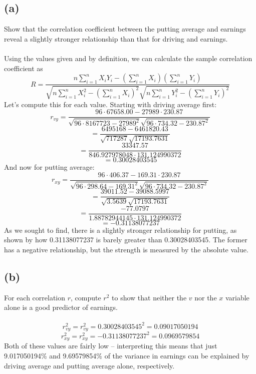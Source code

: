 \documentclass{article}
\begin{document}
{\subsection*{(a)} 
Show that the correlation coefficient between the
putting average and earnings reveal a slightly stronger relationship than that for driving and earnings.
\\
\\
Using the values given and by definition, we can calculate the sample correlation coefficient as 
\[
R = \frac{n \sum_{i=1}^{n} X_i Y_i - (\sum_{i=1}^{n} X_i)(\sum_{i=1}^{n}Y_i)}{\sqrt{n \sum_{i=1}^{n} X_i^2 - (\sum_{i=1}^{n} X_i)^2} \sqrt{n\sum_{i=1}^{n}Y_i^2 - (\sum_{i=1}^{n} Y_i)^2}}
\]
Let's compute this for each value. Starting with driving average first:
\[
r_{vy} = \frac{96 \cdot 67658.00 - 27989 \cdot 230.87}{\sqrt{96 \cdot 8167723 - 27989^2} \sqrt{96 \cdot 734.32 - 230.87^2}}
\]
\[
= \frac{6495168 - 6461820.43}{\sqrt{717287} \sqrt{17193.7631}}
\]
\[
= \frac{33347.57}{846.927978048 \cdot 131.124990372}
\]
\[
= 0.30028403545
\]
And now for putting average:
\[
r_{xy} = \frac{96 \cdot 406.37 - 169.31 \cdot 230.87}{\sqrt{96 \cdot 298.64 - 169.31^2} \sqrt{96 \cdot 734.32 - 230.87^2}}
\]
\[
= \frac{39011.52 - 39088.5997}{\sqrt{3.5639} \sqrt{17193.7631}}
\]
\[
= \frac{-77.0797}{1.88782944145 \cdot 131.124990372}
\]
\[
= -0.31138077237
\]
As we sought to find, there is a slightly stronger relationship for putting, as shown by how 0.31138077237 is barely greater than 0.30028403545. The former has a negative relationship, but the strength is measured by the absolute value.

\subsection*{(b)} 
For each correlation \(r\), compute \(r^2\) to show that neither the \(v\) nor the \(x\) variable alone is a good predictor of earnings.
\\
\\
\[
r^2_{vy} = r_{vy}^2 = 0.30028403545^2 = 0.09017050194
\]
\[
r^2_{xy} = r_{xy}^2 = -0.31138077237^2 = 0.0969579854
\]
Both of these values are fairly low -- interpreting this means that just 9.017050194\% and 9.69579854\% of the variance in earnings can be explained by driving average and putting average alone, respectively.

}
\end{document}
